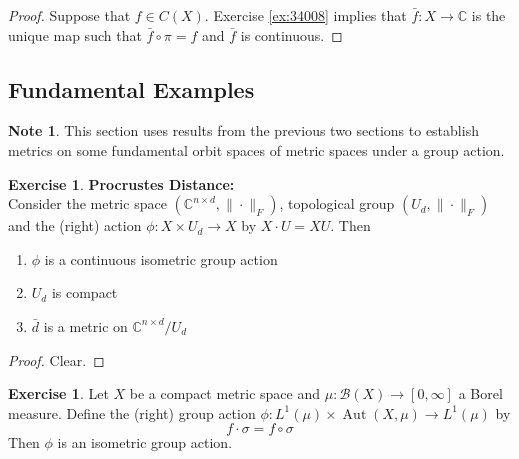 \documentclass[12pt]{amsart}
\theoremstyle{definition}
\newtheorem{note}[definition]{Note}
\newtheorem{ex}[definition]{Exercise}
\newcommand{\sig}{\sigma}
\newcommand{\C}{\mathbb{C}}
\newcommand{\MB}{\mathcal{B}}
\newcommand{\RG}{[0,\infty]}
\DeclareMathOperator{\Aut}{Aut}
\newcommand{\lex}[1]{\label{ex:#1}}
\newcommand{\rex}[1]{Exercise \ref{ex:#1}}
\begin{document}
	\begin{proof}
	Suppose that $f \in C(X)$. \rex{34008} implies that $\bar{f}: X \rightarrow \C$ is the unique map such that $\bar{f} \circ \pi = f$ and $\bar{f}$ is continuous. 
	\end{proof}
	
	
	
	
	
	
	
	
	
	
	
	
	
	
	
	
	
	
	
	
	
	

	
	
	
	
	
	
	
	
	
	
	\newpage
	\subsection{Fundamental Examples}
	\begin{note}
	This section uses results from the previous two sections to establish metrics on some fundamental orbit spaces of metric spaces under a group action. 
	\end{note} 
		
	
	\begin{ex} \lex{} \textbf{Procrustes Distance:} \\
	Consider the metric space $(\C^{n \times d}, \|\cdot\|_F)$, topological group $(U_d, \|\cdot\|_F)$ and  the (right) action $\phi: X \times U_d \rightarrow X$ by $X \cdot U = XU$. Then 
	\begin{enumerate}
	\item $\phi$ is a continuous isometric group action 
	\item $U_d$ is compact 
	\item $\bar{d}$ is a metric on $\C^{n \times d}/ U_d$
	\end{enumerate}
	\end{ex}
	
	\begin{proof}
	Clear.
	\end{proof}		
	
	\begin{ex} \lex{}
	Let $X$ be a compact metric space and $\mu:\MB(X) \rightarrow \RG$ a Borel measure. Define the (right) group action $\phi: L^1(\mu) \times \Aut(X, \mu) \rightarrow L^1(\mu) $ by $$f \cdot \sig = f \circ \sig$$ Then $\phi$ is an isometric group action. 
	\end{ex}
	
\end{document}
